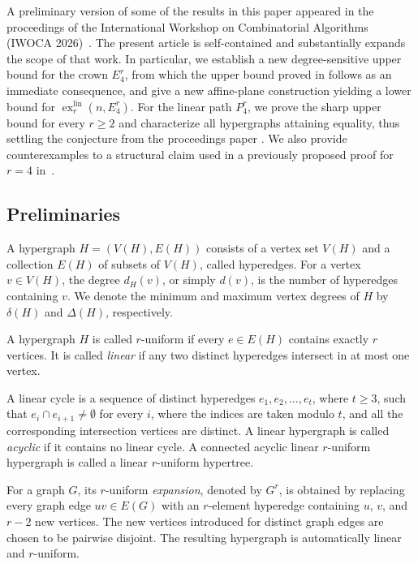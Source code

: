 \documentclass[11pt,a4paper]{article}
\theoremstyle{definition}
\theoremstyle{remark}
\begin{document}
A preliminary version of some of the results in this paper appeared in
the proceedings of the International Workshop on Combinatorial
Algorithms (IWOCA 2026)~\cite{AdakVerma2026}. The present article is
self-contained and substantially expands the scope of that work. In
particular, we establish a new degree-sensitive upper bound for the
crown \(E_4^r\), from which the upper bound proved in
\cite{AdakVerma2026} follows as an immediate consequence, and give a new
affine-plane construction yielding a lower bound for
\(\operatorname{ex}^{\mathrm{lin}}_r(n,E_4^r)\). For the linear path
\(P_4^r\), we prove the sharp upper bound for every \(r\geq 2\) and
characterize all hypergraphs attaining equality, thus settling the conjecture from the proceedings paper \cite{AdakVerma2026}.  We also provide
counterexamples to a structural claim used in a previously proposed
proof for \(r=4\) in~\cite{zhang2025linear}.

\subsection{Preliminaries}

A hypergraph \(H=(V(H),E(H))\) consists of a vertex set \(V(H)\) and a
collection \(E(H)\) of subsets of \(V(H)\), called hyperedges. For a
vertex \(v\in V(H)\), the degree \(d_H(v)\), or simply \(d(v)\), is the
number of hyperedges containing \(v\). We denote the minimum and
maximum vertex degrees of \(H\) by \(\delta(H)\) and \(\Delta(H)\),
respectively.

A hypergraph \(H\) is called \(r\)-uniform if every
\(e\in E(H)\) contains exactly \(r\) vertices. It is called
\emph{linear} if any two distinct hyperedges intersect in at most one
vertex.

A linear cycle is a sequence of distinct hyperedges
$e_1,e_2,\ldots,e_t$, where $t\geq 3$,
such that
$e_i\cap e_{i+1}\neq\emptyset$
for every \(i\), where the indices are taken modulo \(t\), and all the
corresponding intersection vertices are distinct. A linear hypergraph
is called \emph{acyclic} if it contains no linear cycle. A connected
acyclic linear \(r\)-uniform hypergraph is called a linear
\(r\)-uniform hypertree.

For a graph \(G\), its \(r\)-uniform \emph{expansion}, denoted by
\(G^r\), is obtained by replacing every graph edge \(uv\in E(G)\) with
an \(r\)-element hyperedge containing \(u\), \(v\), and \(r-2\) new
vertices. The new vertices introduced for distinct graph edges are
chosen to be pairwise disjoint. The resulting hypergraph is
automatically linear and \(r\)-uniform.
\end{document}

